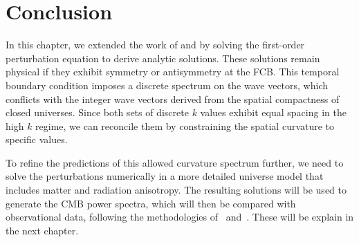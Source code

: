 \section{Conclusion} 
In this chapter, we extended the work of \citet{2022PhRvD.105h3514L} and \citet{2021arXiv210906204B} by solving the first-order perturbation equation to derive analytic solutions. These solutions remain physical if they exhibit symmetry or antisymmetry at the FCB. This temporal boundary condition imposes a discrete spectrum on the wave vectors, which conflicts with the integer wave vectors derived from the spatial compactness of closed universes. Since both sets of discrete \(k\) values exhibit equal spacing in the high \(k\) regime, we can reconcile them by constraining the spatial curvature to specific values. 

To refine the predictions of this allowed curvature spectrum further, we need to solve the perturbations numerically in a more detailed universe model that includes matter and radiation anisotropy. The resulting solutions will be used to generate the CMB power spectra, which will then be compared with observational data, following the methodologies of~\cite{2022PhRvD.105h3515B} and~\cite{2022PhRvD.105l3508P}. These will be explain in the next chapter. 








\printbibliography[heading=subbibintoc, title={References for Chapter \thechapter}]
